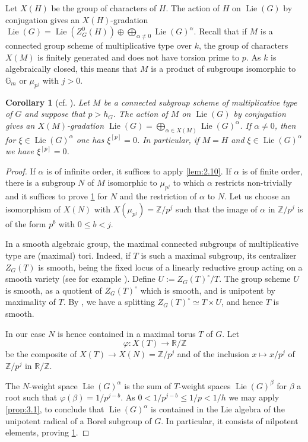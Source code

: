 \documentclass[11pt,a4paper]{article}
\theoremstyle{plain}
\newtheorem{corollary}[theorem]{Corollary}
\theoremstyle{definition}
\DeclareMathOperator{\Lie}{Lie}
\newcommand{\G}{\mathbb{G}}
\newcommand{\ZZ}{\mathbb{Z}}
\newcommand{\RR}{\mathbb{R}}
\begin{document}
Let $X(H)$ be the group of characters of $H$. The action of $H$ on $\Lie(G)$ by conjugation gives an $X(H)$-gradation $\Lie(G) = \Lie(Z_G^0(H)) \oplus \bigoplus_{\alpha \neq 0} \Lie(G)^\alpha$. Recall that if $M$ is a connected group scheme of multiplicative type over $k$, the group of characters $X(M)$ is finitely generated and does not have torsion prime to $p$. As $k$ is algebraically closed, this means that $M$ is a product of subgroups isomorphic to $\G_m$ or $\mu_{p^j}$ with $j > 0$.

\begin{corollary}[{cf. \cite[Lemma~2.12]{D}}] \label{cor:3.3}
Let $M$ be a connected subgroup scheme of multiplicative type of $G$ and suppose that $p > h_G$. The action of $M$ on $\Lie(G)$ by conjugation gives an $X(M)$-gradation $\Lie(G) = \bigoplus_{\alpha \in X(M)} \Lie(G)^\alpha$. If $\alpha \neq 0$, then for $\xi \in \Lie(G)^\alpha$ one has $\xi^{[p]} = 0$. In particular, if $M = H$ and $\xi \in \Lie(G)^\alpha$ we have $\xi^{[p]} = 0$.
\end{corollary}

\begin{proof}
If $\alpha$ is of infinite order, it suffices to apply \ref{lem:2.10}. If $\alpha$ is of finite order, there is a subgroup $N$ of $M$ isomorphic to $\mu_{p^j}$ to which $\alpha$ restricts non-trivially and it suffices to prove \ref{cor:3.3} for $N$ and the restriction of $\alpha$ to $N$. Let us choose an isomorphism of $X(N)$ with $X(\mu_{p^j}) = \ZZ/p^j$ such that the image of $\alpha$ in $\ZZ/p^j$ is of the form $p^b$ with $0 \leq b < j$.

In a smooth algebraic group, the maximal connected subgroups of multiplicative type are (maximal) tori. Indeed, if $T$ is such a maximal subgroup, its centralizer $Z_G(T)$ is smooth, being the fixed locus of a linearly reductive group acting on a smooth variety (see for example \cite[Theorem~2.8, Chapter~II, \S5]{DG}). Define $U := Z_G(T)^\circ/T$. The group scheme $U$ is smooth, as a quotient of $Z_G(T)^\circ$ which is smooth, and is unipotent by maximality of $T$. By \cite[SGA3, Expos\'e XVII, Theorem~6.1.1]{SGA3}, we have a splitting $Z_G(T)^\circ \simeq T \times U$, and hence $T$ is smooth.

In our case $N$ is hence contained in a maximal torus $T$ of $G$. Let
\begin{equation} \label{eq:3.3.1}
\varphi : X(T) \to \RR/\ZZ
\end{equation}
be the composite of $X(T) \to X(N) = \ZZ/p^j$ and of the inclusion $x \mapsto x/p^j$ of $\ZZ/p^j$ in $\RR/\ZZ$.

The $N$-weight space $\Lie(G)^\alpha$ is the sum of $T$-weight spaces $\Lie(G)^\beta$ for $\beta$ a root such that $\varphi(\beta) = 1/p^{j-b}$. As $0 < 1/p^{j-b} \leq 1/p < 1/h$ we may apply \ref{prop:3.1}, to conclude that $\Lie(G)^\alpha$ is contained in the Lie algebra of the unipotent radical of a Borel subgroup of $G$. In particular, it consists of nilpotent elements, proving \ref{cor:3.3}. \qedhere
\end{proof}
\end{document}
